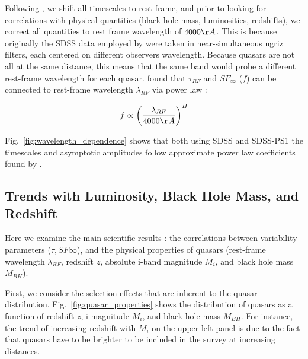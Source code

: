 \documentclass[twocolumn]{aastex62}
\begin{document}
Following  \citet{macleod2011} , we shift all timescales to rest-frame, and prior to looking for correlations with physical quantities (black hole mass, luminosities, redshifts), we correct all quantities to rest frame wavelength of $4000 \AA $. This is because originally the SDSS data employed by  \citet{macleod2011}  were taken in near-simultaneous ugriz filters, each centered on different observers wavelength. Because quasars are not all at the same distance, this means that the same band would probe a different rest-frame wavelength for each quasar.   \citet{macleod2011}  found that $\tau_{RF}$ and $SF_{\infty}$  ($f$) can be connected to rest-frame wavelength $\lambda_{RF}$ via power law  :  

\begin{equation}
f \propto \left( \frac{\lambda_{RF}}{4000 \AA} \right)^{B}
\end{equation}

Fig.~\ref{fig:wavelength_dependence}  shows that both using SDSS and SDSS-PS1 the timescales and asymptotic amplitudes follow approximate power law coefficients found by \citet{macleod2011}. 
\
\begin{figure*}
\caption{Rest-frame timescale $\tau$ (top panel), and long-term structure function $SF_{\infty}$ (bottom panel), as a function of rest-frame wavelength $\lambda_{RF}$. The background contours show \citet{macleod2011} SDSS ugriz data, and the foreground contours  denote the SDSS (red) and SDSS-PS1 (orange) new results with Celerite. In all datasets the quasars were selected according to criteria of \citet{macleod2011}. The red line indicates the best-fit power law to \citet{macleod2011} data, with $B=0.17$ an $-0.479$ for $\tau_{RF}$, and $SF_{\infty}$, respectively.}
\label{fig:wavelength_dependence}
\end{figure*} 


\subsection{Trends with Luminosity, Black Hole Mass, and Redshift}

Here we examine the main scientific results : the correlations between variability parameters  ($\tau, SF{\infty}$), and the physical properties of quasars (rest-frame wavelength $\lambda_{RF}$, redshift $z$, absolute i-band magnitude $M_{i}$, and black hole mass $M_{BH}$). 

First, we consider the selection effects that are inherent to the quasar distribution. Fig.~\ref{fig:quasar_properties} shows the distribution of quasars as a function of redshift $z$, i magnitude $M_{i}$, and black hole mass $M_{BH}$. For instance, the trend of increasing redshift with $M_{i}$ on the upper left panel is due to the fact that quasars have to be brighter to be included in the survey at increasing distances. 
\end{document}
